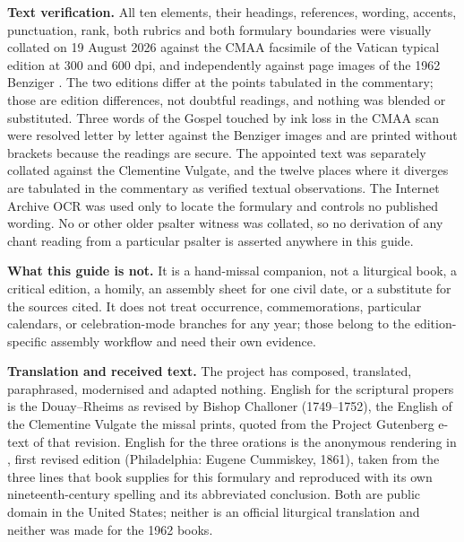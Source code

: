 \textbf{Text verification.} All ten elements, their headings, references,
wording, accents, punctuation, rank, both rubrics and both formulary
boundaries were visually collated on 19 August 2026 against the CMAA facsimile
of the Vatican typical edition at 300 and 600 dpi, and independently against
page images of the 1962 Benziger . The two
editions differ at the points tabulated in the commentary; those are edition
differences, not doubtful readings, and nothing was blended or substituted.
Three words of the Gospel touched by ink loss in the CMAA scan were resolved
letter by letter against the Benziger images and are printed without brackets
because the readings are secure. The appointed text was separately collated
against the Clementine Vulgate, and the twelve places where it diverges are
tabulated in the commentary as verified textual observations. The Internet
Archive OCR was used only to locate the formulary and controls no published
wording. No  or other older psalter witness was
collated, so no derivation of any chant reading from a particular psalter is
asserted anywhere in this guide.

\textbf{What this guide is not.} It is a hand-missal companion, not a
liturgical book, a critical edition, a homily, an assembly sheet for one civil
date, or a substitute for the sources cited. It does not treat occurrence,
commemorations, particular calendars, or celebration-mode branches for any
year; those belong to the edition-specific assembly workflow and need their own
evidence.

\textbf{Translation and received text.} The project has composed, translated,
paraphrased, modernised and adapted nothing. English for the scriptural propers
is the Douay--Rheims as revised by Bishop Challoner (1749--1752), the English
of the Clementine Vulgate the missal prints, quoted from the Project Gutenberg
e-text of that revision. English for the three orations is the anonymous
rendering in , first revised edition (Philadelphia: Eugene Cummiskey,
1861), taken from the three lines that book supplies for this formulary and
reproduced with its own nineteenth-century spelling and its abbreviated
conclusion. Both are public domain in the United States; neither is an official
liturgical translation and neither was made for the 1962 books.

